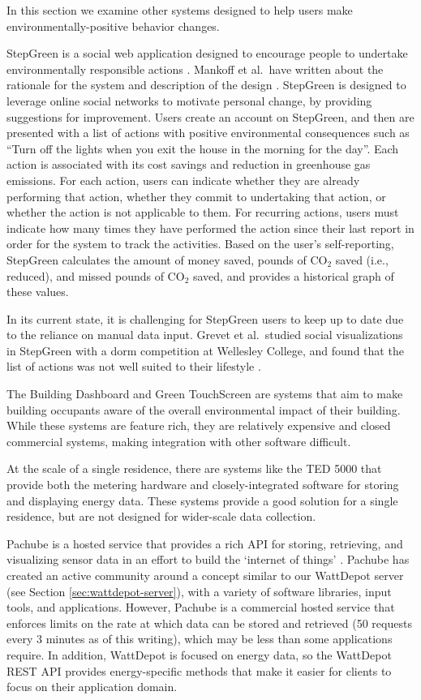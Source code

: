 In this section we examine other systems designed to help users make environmentally-positive behavior changes.

StepGreen is a social web application designed to encourage people to undertake environmentally responsible actions \cite{step-green-website}. Mankoff et al.\ have written about the rationale for the system and description of the design  \cite{Mankoff2007Leveraging-Soci}. StepGreen is designed to leverage online social networks to motivate personal change, by providing suggestions for improvement. Users create an account on StepGreen, and then are presented with a list of actions with positive environmental consequences such as ``Turn off the lights when you exit the house in the morning for the day''. Each action is associated with its cost savings and reduction in greenhouse gas emissions. For each action, users can indicate whether they are already performing that action, whether they commit to undertaking that action, or whether the action is not applicable to them. For recurring actions, users must indicate how many times they have performed the action since their last report in order for the system to track the activities. Based on the user's self-reporting, StepGreen calculates the amount of money saved, pounds of CO$_2$ saved (i.e., reduced), and missed pounds of CO$_2$ saved, and provides a historical graph of these values.

In its current state, it is challenging for StepGreen users to keep up to date due to the reliance on manual data input. Grevet et al.\ studied social visualizations in StepGreen with a dorm competition at Wellesley College, and found that the list of actions was not well suited to their lifestyle \cite{Grevet10}.

The Building Dashboard \cite{building-dashboard} and Green TouchScreen \cite{greentouchscreen} are systems that aim to make building occupants aware of the overall environmental impact of their building. While these systems are feature rich, they are relatively expensive and closed commercial systems, making integration with other software difficult.

At the scale of a single residence, there are systems like the TED 5000 \cite{the-energy-detective} that provide both the metering hardware and closely-integrated software for storing and displaying energy data. These systems provide a good solution for a single residence, but are not designed for wider-scale data collection.

Pachube is a hosted service that provides a rich API for storing, retrieving, and visualizing sensor data in an effort to build the `internet of things' \cite{pachube-site}. Pachube has created an active community around a concept similar to our WattDepot server (see Section \ref{sec:wattdepot-server}), with a variety of software libraries, input tools, and applications. However, Pachube is a commercial hosted service that enforces limits on the rate at which data can be stored and retrieved (50 requests every 3 minutes as of this writing), which may be less than some applications require. In addition, WattDepot is focused on energy data, so the WattDepot REST API provides energy-specific methods that make it easier for clients to focus on their application domain.

